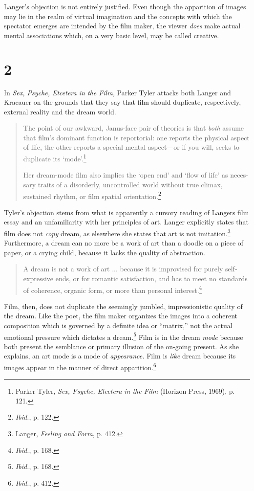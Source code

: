 \documentclass{tufte-handout}
\begin{document}
\noindent Langer's objection is not entirely justified. Even though the apparition
of images may lie in the realm of virtual imagination and the concepts
with which the spectator emerges are intended by the film maker, the
viewer \emph{does} make actual mental associations which, on a very
basic level, may be called creative.

\hypertarget{2}{%
\section{\textbf{2}}\label{2}}

In \emph{Sex, Psyche, Etcetera in the Film,} Parker Tyler attacks both
Langer and Kracauer on the grounds that they say that film should
duplicate, re­spectively, external reality and the dream world.

\begin{quote}
The point of our awkward, Janus-face pair of theories is that
\emph{both} assume that film's dominant function is reportorial: one
reports the physical aspect of life, the other reports a special mental
aspect---or if you will, seeks to duplicate its `mode'.\footnote{Parker
  Tyler, \emph{Sex, Psyche, Etcetera in the Film} (Horizon Press, 1969),
  p. 121.}

Her dream-mode film also implies the `open end' and `flow of life' as
neces­sary traits of a disorderly, uncontrolled world without true
climax, sustained rhythm, or film spatial orientation.\footnote{\emph{Ibid.},
  p. 122.}
\end{quote}

\noindent Tyler's objection stems from what is apparently a cursory reading of
Langer\textquotesingle s film essay and an unfamiliarity with her
principles of art. Langer explicitly states that film does not
\emph{copy} dream, as elsewhere she states that art is not
imitation.\footnote{Langer, \emph{Feeling and Form}, p. 412.}
Furthermore, a dream can no more be a work of art than a doodle on a
piece of paper, or a crying child, because it lacks the quality of
abstraction.

\begin{quote}
A dream is not a work of art ... because it is improvised for purely
self­ expressive ends, or for romantic satisfaction, and has to meet no
standards of coherence, organic form, or more than personal
interest.\footnote{\emph{Ibid.}, p. 168.}
\end{quote}

\noindent Film, then, does not duplicate the seemingly jumbled, impressionistic
qual­ity of the dream. Like the poet, the film maker organizes the images
into a coherent composition which is governed by a definite idea or
``matrix,'' not the actual emotional pressure which dictates a
dream.\footnote{\emph{Ibid.}, p. 168.} Film is in the dream \emph{mode}
because both present the semblance or primary illusion of the on-going
present. As she explains, an art mode is a mode of \emph{appearance.}
Film is \emph{like} dream because its images appear in the manner of
direct appari­tion.\footnote{\emph{Ibid.}, p. 412.}
\end{document}
